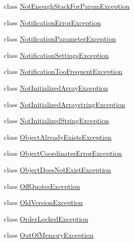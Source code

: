 \begin{DoxyCompactItemize}
\item 
class \hyperlink{class_m_q_l4_c_sharp_1_1_base_1_1_exceptions_1_1_not_enough_stack_for_param_exception}{Not\+Enough\+Stack\+For\+Param\+Exception}
\item 
class \hyperlink{class_m_q_l4_c_sharp_1_1_base_1_1_exceptions_1_1_notification_error_exception}{Notification\+Error\+Exception}
\item 
class \hyperlink{class_m_q_l4_c_sharp_1_1_base_1_1_exceptions_1_1_notification_parameter_exception}{Notification\+Parameter\+Exception}
\item 
class \hyperlink{class_m_q_l4_c_sharp_1_1_base_1_1_exceptions_1_1_notification_settings_exception}{Notification\+Settings\+Exception}
\item 
class \hyperlink{class_m_q_l4_c_sharp_1_1_base_1_1_exceptions_1_1_notification_too_frequent_exception}{Notification\+Too\+Frequent\+Exception}
\item 
class \hyperlink{class_m_q_l4_c_sharp_1_1_base_1_1_exceptions_1_1_not_initialized_array_exception}{Not\+Initialized\+Array\+Exception}
\item 
class \hyperlink{class_m_q_l4_c_sharp_1_1_base_1_1_exceptions_1_1_not_initialized_arraystring_exception}{Not\+Initialized\+Arraystring\+Exception}
\item 
class \hyperlink{class_m_q_l4_c_sharp_1_1_base_1_1_exceptions_1_1_not_initialized_string_exception}{Not\+Initialized\+String\+Exception}
\item 
class \hyperlink{class_m_q_l4_c_sharp_1_1_base_1_1_exceptions_1_1_object_already_exists_exception}{Object\+Already\+Exists\+Exception}
\item 
class \hyperlink{class_m_q_l4_c_sharp_1_1_base_1_1_exceptions_1_1_object_coordinates_error_exception}{Object\+Coordinates\+Error\+Exception}
\item 
class \hyperlink{class_m_q_l4_c_sharp_1_1_base_1_1_exceptions_1_1_object_does_not_exist_exception}{Object\+Does\+Not\+Exist\+Exception}
\item 
class \hyperlink{class_m_q_l4_c_sharp_1_1_base_1_1_exceptions_1_1_off_quotes_exception}{Off\+Quotes\+Exception}
\item 
class \hyperlink{class_m_q_l4_c_sharp_1_1_base_1_1_exceptions_1_1_old_version_exception}{Old\+Version\+Exception}
\item 
class \hyperlink{class_m_q_l4_c_sharp_1_1_base_1_1_exceptions_1_1_order_locked_exception}{Order\+Locked\+Exception}
\item 
class \hyperlink{class_m_q_l4_c_sharp_1_1_base_1_1_exceptions_1_1_out_of_memory_exception}{Out\+Of\+Memory\+Exception}

\end{DoxyCompactItemize}
